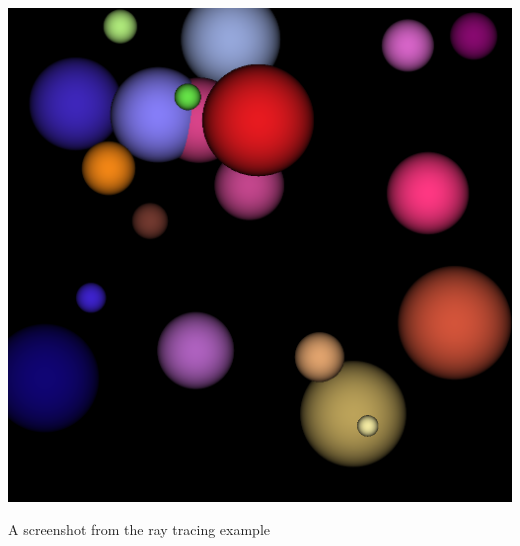 \documentclass[letterpaper,10pt,english]{sphinxmanual}
\begin{document}
{\hfill\includegraphics{RayTracing.png}\hfill}

A screenshot from the ray tracing example
\end{document}
